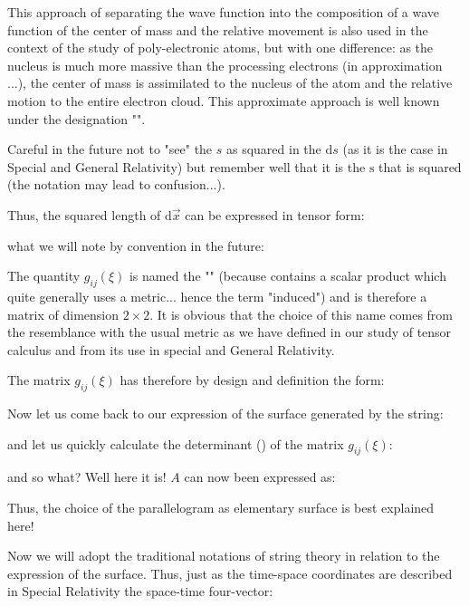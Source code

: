 	\begin{tcolorbox}[title=Remark,colframe=black,arc=10pt]
	This approach of separating the wave function into the composition of a wave function of the center of mass and the relative movement is also used in the context of the study of poly-electronic atoms, but with one difference: as the nucleus is much more massive than the processing electrons (in approximation ...), the center of mass is assimilated to the nucleus of the atom and the relative motion to the entire electron cloud. This approximate approach is well known under the designation "".
	\end{tcolorbox}
	Careful in the future not to "see" the $s$ as squared in the $\mathrm{d}s$ (as it is the case in Special and General Relativity) but remember well that it is the $\mathrm{s}$ that is squared (the notation may lead to confusion...).
	
	Thus, the squared length of $\mathrm{d}\vec{x}$ can be expressed in tensor form:
	
	what we will note by convention in the future:
	
	The quantity $g_{ij}(\xi)$  is named the "" (because contains a scalar product which quite generally uses a metric... hence the term "induced") and is therefore a matrix of dimension $2 \times 2$. It is obvious that the choice of this name comes from the resemblance with the usual metric as we have defined in our study of tensor calculus and from its use in special and General Relativity.
	
	The matrix $g_{ij}(\xi)$ has therefore by design and definition the form:
	
	Now let us come back to our expression of the surface generated by the string:
	
	and let us quickly calculate the determinant () of the matrix $g_{ij}(\xi)$:
	
	and so what? Well here it is! $A$ can now been expressed as:
	
	Thus, the choice of the parallelogram as elementary surface is best explained here!
	
	Now we will adopt the traditional notations of string theory in relation to the expression of the surface. Thus, just as the time-space coordinates are described in Special Relativity the space-time four-vector:
	
